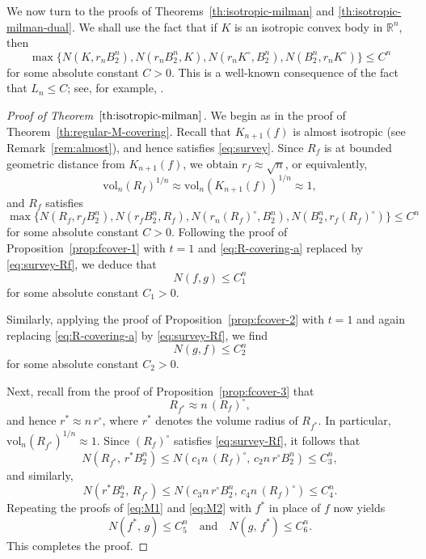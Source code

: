 \documentclass[11pt,leqno]{article}
\theoremstyle{definition}
\theoremstyle{remark}
\numberwithin{equation}{section}
\newcommand{\vol}{\mathrm{vol}}
\newcommand{\ls}{\leqslant}
\begin{document}
We now turn to the proofs of Theorems~\ref{th:isotropic-milman} and 
\ref{th:isotropic-milman-dual}. We shall use the fact that if $K$ is an 
isotropic convex body in $\mathbb{R}^n$, then
\begin{equation}\label{eq:survey}\max\big\{N(K,r_nB_2^n), N(r_nB_2^n,K), N( r_nK^{\circ},B_2^n),
N(B_2^n,r_nK^{\circ})\big\}\ls C^n\end{equation}
for some absolute constant $C>0$. This is a well-known consequence of the 
fact that $L_n \ls C$; see, for example, 
\cite[Theorem~3.3]{Giannopoulos-Pafis-Tziotziou-survey}.

\begin{proof}[Proof of Theorem~$\ref{th:isotropic-milman}$]
We begin as in the proof of Theorem~\ref{th:regular-M-covering}. 
Recall that $K_{n+1}(f)$ is almost isotropic (see Remark~\ref{rem:almost}), and hence satisfies 
\eqref{eq:survey}. Since $R_f$ is at bounded geometric distance from 
$K_{n+1}(f)$, we obtain $r_f \approx \sqrt{n}$, or equivalently,
$$\vol_n(R_f)^{1/n}\approx \vol_n(K_{n+1}(f))^{1/n}\approx 1,$$ 
and $R_f$ satisfies
\begin{equation}\label{eq:survey-Rf}\max\big\{N(R_f,r_fB_2^n), N(r_fB_2^n,R_f), N(r_n(R_f)^{\circ},B_2^n),
N(B_2^n,r_f(R_f)^{\circ})\big\}\ls C^n\end{equation}
for some absolute constant $C>0$. Following the proof of Proposition~\ref{prop:fcover-1} with $t=1$ and
\eqref{eq:R-covering-a} replaced by \eqref{eq:survey-Rf}, we deduce that
\begin{equation}\label{eq:M1}N(f,g)\ls C_1^n\end{equation}
for some absolute constant $C_1>0$.

Similarly, applying the proof of Proposition~\ref{prop:fcover-2} with $t=1$ 
and again replacing \eqref{eq:R-covering-a} by \eqref{eq:survey-Rf}, we find
\begin{equation}\label{eq:M2}N(g,f)\ls C_2^n\end{equation}
for some absolute constant $C_2>0$.

Next, recall from the proof of Proposition~\ref{prop:fcover-3} that
$$R_{f^{\ast}}\approx n\, (R_f)^{\circ},$$
and hence $r^{\ast} \approx n\, r^{\circ}$, where $r^{\ast}$ denotes the volume 
radius of $R_{f^{\ast}}$. In particular, $\vol_n(R_{f^{\ast}})^{1/n} \approx 1$. 
Since $(R_f)^{\circ}$ satisfies \eqref{eq:survey-Rf}, it follows that
$$N(R_{f^{\ast}},\, r^{\ast} B_2^n)\ls N(c_1n\,(R_f)^{\circ},\, c_2n\,r^{\circ}B_2^n)
\ls C_3^n,$$
and similarly,
$$N(r^{\ast}B_2^n,\, R_{f^{\ast}})\ls N(c_3n\,r^{\circ}B_2^n,\, c_4n\, (R_f)^{\circ})\ls C_4^n.$$
Repeating the proofs of \eqref{eq:M1} and \eqref{eq:M2} with $f^{\ast}$ in place 
of $f$ now yields
\begin{equation}\label{eq:M3-M4}N(f^{\ast},\, g)\ls C_5^n\quad \text{and}\quad  N(g,\,f^{\ast})
\ls C_6^n.\end{equation}
This completes the proof.\end{proof}
\end{document}
